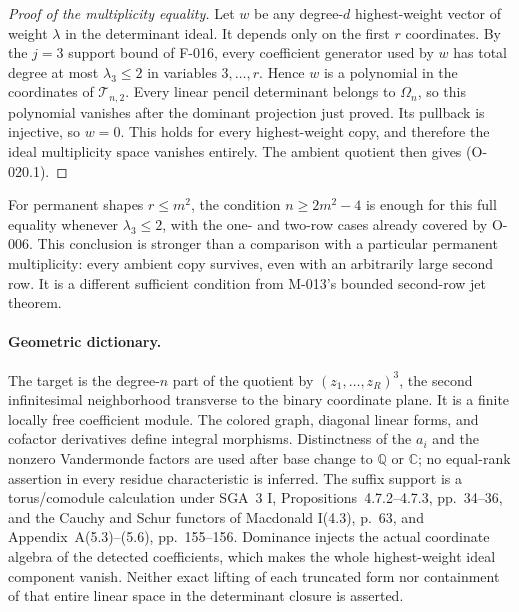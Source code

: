 \begin{proof}[Proof of the multiplicity equality]
Let $w$ be any degree-$d$ highest-weight vector of weight
$\lambda$ in the determinant ideal. It depends only on
the first $r$ coordinates. By the $j=3$ support bound
of F-016, every coefficient generator used by $w$ has
total degree at most $\lambda_3\leq2$ in variables
$3,\ldots,r$. Hence $w$ is a polynomial in the
coordinates of $\mathcal T_{n,2}$.
Every linear pencil determinant belongs to $\Omega_n$,
so this polynomial vanishes after the dominant projection
just proved. Its pullback is injective, so $w=0$.
This holds for every highest-weight copy, and therefore
the ideal multiplicity space vanishes entirely. The
ambient quotient then gives (O-020.1).
\end{proof}

For permanent shapes $r\leq m^2$, the condition
$n\geq2m^2-4$ is enough for this full equality whenever
$\lambda_3\leq2$, with the one- and two-row cases already
covered by O-006. This conclusion is stronger than a
comparison with a particular permanent multiplicity: every
ambient copy survives, even with an arbitrarily large second
row. It is a different sufficient condition from M-013's
bounded second-row jet theorem.

\paragraph{Geometric dictionary.}
The target is the degree-$n$ part of the quotient by
$(z_1,\ldots,z_R)^3$, the second infinitesimal neighborhood
transverse to the binary coordinate plane. It is a finite
locally free coefficient module. The colored graph, diagonal
linear forms, and cofactor derivatives define integral
morphisms. Distinctness of the $a_i$ and the nonzero
Vandermonde factors are used after base change to
$\mathbb Q$ or $\mathbb C$; no equal-rank assertion in
every residue characteristic is inferred.
The suffix support is a torus/comodule calculation under
SGA~3 I, Propositions~4.7.2--4.7.3, pp.~34--36,
and the Cauchy and Schur functors of Macdonald I(4.3),
p.~63, and Appendix~A(5.3)--(5.6), pp.~155--156.
Dominance injects the actual coordinate algebra of the
detected coefficients, which makes the whole highest-weight
ideal component vanish. Neither exact lifting of each
truncated form nor containment of that entire linear space
in the determinant closure is asserted.

